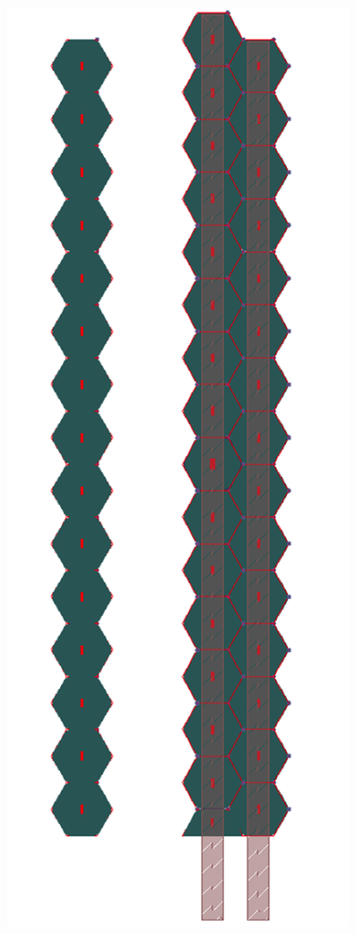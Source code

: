 \begin{figure}
	\begin{minipage}[b]{.49\textwidth}
		\includegraphics[width=\linewidth]{Calorimeter/SiliconTungstenSiD/hexagon}

\end{minipage}
\end{figure}
